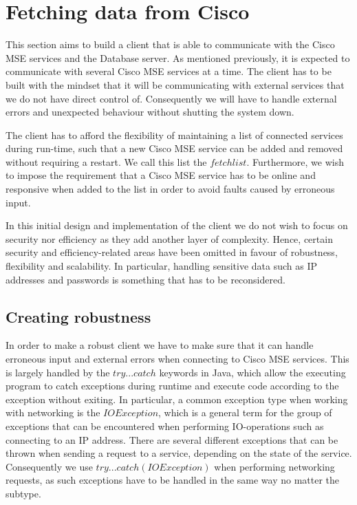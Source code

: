 \section{Fetching data from Cisco}
This section aims to build a client that is able to communicate with the Cisco MSE services and the Database server. As mentioned previously, it is expected to communicate with several Cisco MSE services at a time. The client has to be built with the mindset that it will be communicating with external services that we do not have direct control of. Consequently we will have to handle external errors and unexpected behaviour without shutting the system down. 

The client has to afford the flexibility of maintaining a list of connected services during run-time, such that a new Cisco MSE service can be added and removed without requiring a restart. We call this list the $fetch list$. Furthermore, we wish to impose the requirement that a Cisco MSE service has to be online and responsive when added to the list in order to avoid faults caused by erroneous input.

In this initial design and implementation of the client we do not wish to focus on security nor efficiency as they add another layer of complexity. Hence, certain security and efficiency-related areas have been omitted in favour of robustness, flexibility and scalability. In particular, handling sensitive data such as IP addresses and passwords is something that has to be reconsidered.

\subsection*{Creating robustness}
In order to make a robust client we have to make sure that it can handle erroneous input and external errors when connecting to Cisco MSE services. This is largely handled by the $try...catch$ keywords in Java, which allow the executing program to catch exceptions during runtime and execute code according to the exception without exiting. In particular, a common exception type when working with networking is the $IOException$, which is a general term for the group of exceptions that can be encountered when performing IO-operations such as connecting to an IP address. There are several different exceptions that can be thrown when sending a request to a service, depending on the state of the service. Consequently we use $try... catch(IOException)$ when performing networking requests, as such exceptions  have to be handled in the same way no matter the subtype.


